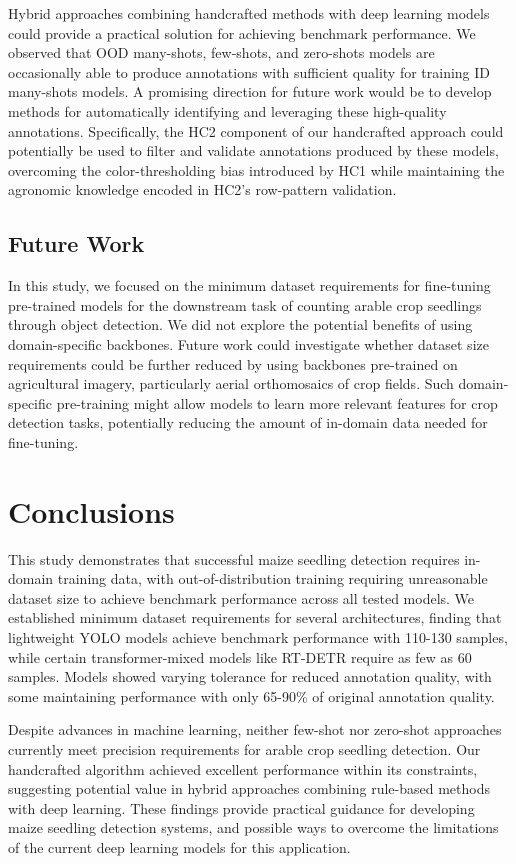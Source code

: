 \documentclass[12pt,a4paper,oneside]{report}
\begin{document}
Hybrid approaches combining handcrafted methods with deep learning models could provide a practical solution 
for achieving benchmark performance. We observed that OOD many-shots, few-shots, and zero-shots models are 
occasionally able to produce annotations with sufficient quality for training ID many-shots models. A promising 
direction for future work would be to develop methods for automatically identifying and leveraging these 
high-quality annotations. Specifically, the HC2 component of our handcrafted approach could potentially be used 
to filter and validate annotations produced by these models, overcoming the color-thresholding bias introduced 
by HC1 while maintaining the agronomic knowledge encoded in HC2's row-pattern validation.

\subsection{Future Work}
In this study, we focused on the minimum dataset requirements for fine-tuning pre-trained models for the 
downstream task of counting arable crop seedlings through object detection. We did not explore the potential 
benefits of using domain-specific backbones. Future work could investigate whether dataset size requirements 
could be further reduced by using backbones pre-trained on agricultural imagery, particularly aerial 
orthomosaics of crop fields. Such domain-specific pre-training might allow models to learn more relevant 
features for crop detection tasks, potentially reducing the amount of in-domain data needed for fine-tuning.

\section{Conclusions}

This study demonstrates that successful maize seedling detection requires in-domain 
training data, with out-of-distribution training requiring unreasonable dataset size to 
achieve benchmark performance across all tested models. 
We established minimum dataset requirements for several 
architectures, finding that lightweight YOLO models achieve benchmark performance 
with 110-130 samples, while certain transformer-mixed models like RT-DETR require as 
few as 60 samples. Models showed varying tolerance for reduced annotation quality, 
with some maintaining performance with only 65-90\% of original annotation quality.

Despite advances in machine learning, neither few-shot nor zero-shot approaches currently 
meet precision requirements for arable crop seedling detection. Our handcrafted 
algorithm achieved excellent performance within its constraints, suggesting potential 
value in hybrid approaches combining rule-based methods with deep learning. These 
findings provide practical guidance for developing maize seedling detection 
systems, and possible ways to overcome the limitations of the current deep learning
models for this application.



\end{document}
